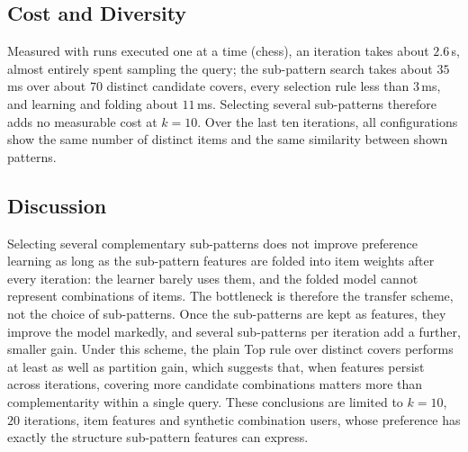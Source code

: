 \subsection{Cost and Diversity}
\label{subsec:cost}

Measured with runs executed one at a time (chess), an iteration takes about $2.6$\,s, almost entirely spent
sampling the query; the sub-pattern search takes about $35$\,ms over about $70$ distinct candidate covers,
every selection rule less than $3$\,ms, and learning and folding about $11$\,ms. Selecting several
sub-patterns therefore adds no measurable cost at $k = 10$. Over the last ten iterations, all
configurations show the same number of distinct items and the same similarity between shown patterns.

\subsection{Discussion}
\label{subsec:discussion}

Selecting several complementary sub-patterns does not improve preference learning as long as the
sub-pattern features are folded into item weights after every iteration: the learner barely uses them,
and the folded model cannot represent combinations of items. The bottleneck is therefore the transfer
scheme, not the choice of sub-patterns. Once the sub-patterns are kept as features, they improve the model
markedly, and several sub-patterns per iteration add a further, smaller gain. Under this scheme, the plain
Top rule over distinct covers performs at least as well as partition gain, which suggests that, when
features persist across iterations, covering more candidate combinations matters more than
complementarity within a single query. These conclusions are limited to $k = 10$, $20$ iterations, item
features and synthetic combination users, whose preference has exactly the structure sub-pattern features
can express.
